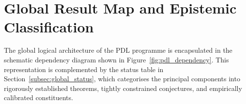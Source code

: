 \documentclass[11pt,a4paper]{article}
\begin{document}
\newpage

\section{Global Result Map and Epistemic Classification}
\label{sec:global_map}

The global logical architecture of the PDL programme is encapsulated in the schematic dependency diagram shown in Figure~\ref{fig:pdl_dependency}. This representation is complemented by the status table in Section~\ref{subsec:global_status}, which categorises the principal components into rigorously established theorems, tightly constrained conjectures, and empirically calibrated constituents.

%
%
\end{document}
